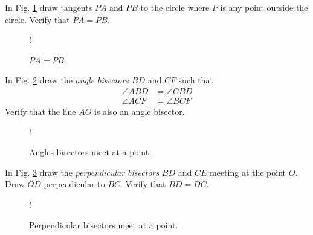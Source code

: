 \documentclass[journal,12pt,twocolumn]{IEEEtran}
\begin{document}
%
%
\begin{problem}
In Fig. \ref{fig:tangent_equal} draw tangents $PA$ and $PB$ to the circle where $P$ is any point outside the circle. Verify that $PA = PB$.
\end{problem}
%
\begin{figure}[!h]
\centering
\resizebox {\columnwidth} {!} {

}
\caption{$PA=PB$.}
\label{fig:tangent_equal}
\end{figure}
%
%
\begin{problem}
In Fig. \ref{fig:ang_bisect} draw the {\em angle bisectors} $BD$ and $CF$ such that 
%
\begin{align}
\angle ABD &= \angle CBD
\\
\angle ACF &= \angle BCF
\end{align}
%
Verify that the line $AO$ is also  an angle bisector.
\end{problem}
%
\begin{figure}[!h]
\centering
\resizebox {\columnwidth} {!} {

}
\caption{Angles bisectors meet at a point.}
\label{fig:ang_bisect}
\end{figure}
%
%
\begin{problem}
In Fig. \ref{fig:perp_bisect} draw the {\em perpendicular bisectors} $BD$ and $CE$ meeting at the point $O$. Draw $OD$ perpendicular to $BC$.  Verify that $BD=DC$.
\end{problem}
%
\begin{figure}[!h]
\centering
\resizebox {\columnwidth} {!} {

}
\caption{Perpendicular bisectors meet at a point.}
\label{fig:perp_bisect}
\end{figure}
%
%
%
%
%
%
%
%
%
\end{document}
